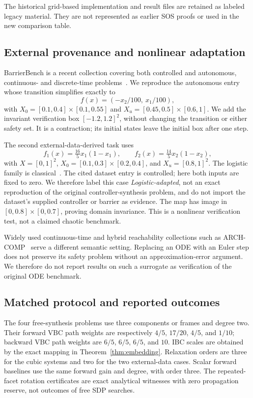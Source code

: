 \documentclass[5p,times]{elsarticle}
\theoremstyle{definition}\newtheorem{definition}[theorem]{Definition}
\theoremstyle{remark}\newtheorem{remark}[theorem]{Remark}
\begin{document}
The historical grid-based implementation and result files are retained as labeled legacy material. They are not represented as earlier SOS proofs or used in the new comparison table.

\subsection{External provenance and nonlinear adaptation}
BarrierBench is a recent collection covering both controlled and autonomous, continuous- and discrete-time problems~\cite{barrierbench,data}. We reproduce the autonomous entry whose transition simplifies exactly to
\[
 f(x)=(-x_2/100,\ x_1/100),
\]
with $X_0=[0.1,0.4]\times[0.1,0.55]$ and $X_u=[0.45,0.5]\times[0.6,1]$. We add the invariant verification box $[-1.2,1.2]^2$, without changing the transition or either safety set. It is a contraction; its initial states leave the initial box after one step.

The second external-data-derived task uses
\[
 f_1(x)=\tfrac{16}{5}x_1(1-x_1),\qquad
 f_2(x)=\tfrac{14}{5}x_2(1-x_2),
\]
with $X=[0,1]^2$, $X_0=[0.1,0.3]\times[0.2,0.4]$, and $X_u=[0.8,1]^2$. The logistic family is classical~\cite{may}. The cited dataset entry is controlled; here both inputs are fixed to zero. We therefore label this case \emph{Logistic-adapted}, not an exact reproduction of the original controller-synthesis problem, and do not import the dataset's supplied controller or barrier as evidence. The map has image in $[0,0.8]\times[0,0.7]$, proving domain invariance. This is a nonlinear verification test, not a claimed chaotic benchmark.

Widely used continuous-time and hybrid reachability collections such as ARCH-COMP~\cite{arch} serve a different semantic setting. Replacing an ODE with an Euler step does not preserve its safety problem without an approximation-error argument. We therefore do not report results on such a surrogate as verification of the original ODE benchmark.

\subsection{Matched protocol and reported outcomes}
The four free-synthesis problems use three components or frames and degree two. Their forward VBC path weights are respectively $4/5$, $17/20$, $4/5$, and $1/10$; backward VBC path weights are $6/5$, $6/5$, $6/5$, and $10$. IBC scales are obtained by the exact mapping in Theorem~\ref{thm:embedding}. Relaxation orders are three for the cubic systems and two for the two external-data cases. Scalar forward baselines use the same forward gain and degree, with order three. The repeated-facet rotation certificates are exact analytical witnesses with zero propagation reserve, not outcomes of free SDP searches.
\end{document}
